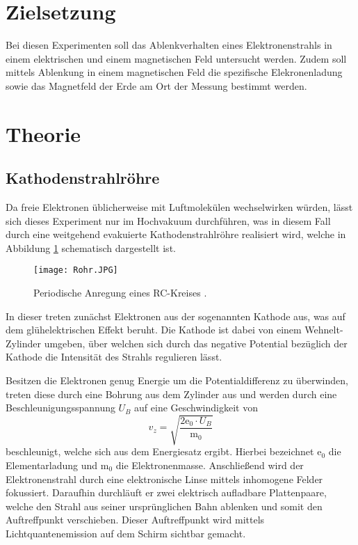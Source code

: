 \section{Zielsetzung}
Bei diesen Experimenten soll das Ablenkverhalten eines Elektronenstrahls in einem
elektrischen und einem magnetischen Feld untersucht werden.
Zudem soll mittels Ablenkung in einem magnetischen Feld die spezifische Elekronenladung
sowie das Magnetfeld der Erde am Ort der Messung bestimmt werden.
\section{Theorie}
\subsection{Kathodenstrahlröhre}
Da freie Elektronen üblicherweise mit Luftmolekülen wechselwirken würden, lässt sich
dieses Experiment nur im Hochvakuum durchführen, was in diesem Fall durch eine weitgehend
evakuierte Kathodenstrahlröhre realisiert wird, welche in Abbildung \ref{fig:rohr} schematisch dargestellt
ist.
\begin{figure}[H]
  \centering
  \texttt{[image: Rohr.JPG]}
  \caption{Periodische Anregung eines RC-Kreises \cite{skript}.}
  \label{fig:rohr}
\end{figure}
In dieser treten zunächst Elektronen aus der sogenannten Kathode aus, was auf dem glühelektrischen
Effekt beruht. Die Kathode ist dabei von einem  Wehnelt-Zylinder umgeben, über welchen
sich durch das negative Potential bezüglich der Kathode die Intensität des Strahls regulieren lässt.

Besitzen die Elektronen genug Energie um die Potentialdifferenz zu
überwinden, treten diese durch eine Bohrung aus dem Zylinder aus und werden durch eine
Beschleunigungsspannung $ U_B $ auf eine Geschwindigkeit von
\begin{equation}
  v_z = \sqrt{\frac{2 \text{e}_0 \cdot U_B }{\text{m}_0}}
  \label{eqn:geschwindigkeit}
\end{equation}
beschleunigt, welche sich aus dem Energiesatz ergibt. Hierbei bezeichnet $\text{e}_0$
die Elementarladung und $\text{m}_0$ die Elektronenmasse.
Anschließend wird der Elektronenstrahl durch eine elektronische Linse mittels inhomogene
Felder fokussiert.
Daraufhin durchläuft er zwei elektrisch aufladbare Plattenpaare, welche den Strahl aus
seiner ursprünglichen Bahn ablenken und somit den Auftreffpunkt verschieben.
Dieser Auftreffpunkt wird mittels Lichtquantenemission auf dem Schirm sichtbar gemacht.

